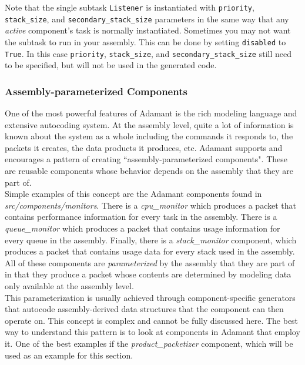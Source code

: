 Note that the single subtask \texttt{Listener} is instantiated with \texttt{priority}, \texttt{stack\_size}, and \texttt{secondary\_stack\_size} parameters in the same way that any \textit{active} component's task is normally instantiated. Sometimes you may not want the subtask to run in your assembly. This can be done by setting \texttt{disabled} to \texttt{True}. In this case \texttt{priority}, \texttt{stack\_size}, and \texttt{secondary\_stack\_size} still need to be specified, but will not be used in the generated code.

\subsubsection{Assembly-parameterized Components}

One of the most powerful features of Adamant is the rich modeling language and extensive autocoding system. At the assembly level, quite a lot of information is known about the system as a whole including the commands it responds to, the packets it creates, the data products it produces, etc. Adamant supports and encourages a pattern of creating ``assembly-parameterized components". These are reusable components whose behavior depends on the assembly that they are part of. \\

Simple examples of this concept are the Adamant components found in \textit{src/components/monitors}. There is a \textit{cpu\_monitor} which produces a packet that contains performance information for every task in the assembly. There is a \textit{queue\_monitor} which produces a packet that contains usage information for every queue in the assembly. Finally, there is a \textit{stack\_monitor} component, which produces a packet that contains usage data for every stack used in the assembly. All of these components are \textit{parameterized} by the assembly that they are part of in that they produce a packet whose contents are determined by modeling data only available at the assembly level. \\

This parameterization is usually achieved through component-specific generators that autocode assembly-derived data structures that the component can then operate on. This concept is complex and cannot be fully discussed here. The best way to understand this pattern is to look at components in Adamant that employ it. One of the best examples if the \textit{product\_packetizer} component, which will be used as an example for this section. \\

